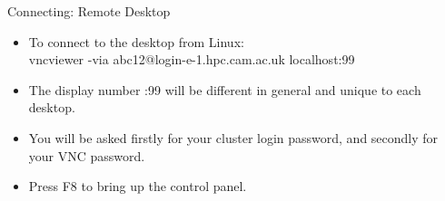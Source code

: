 \begin{frame}[fragile]{Connecting: Remote Desktop}
\begin{itemize}
\item To connect to the desktop from Linux:\\\hfill\break
{\scriptsize
\alert{vncviewer -via abc12@login-e-1.hpc.cam.ac.uk localhost:99}}
\smallskip
\item{The display number \alert{:99} will be different in general and unique to each desktop.}
\item{You will be asked firstly for your cluster login password, and secondly for your VNC password.}
\item{\alert{Press F8 to bring up the control panel.}}
\pause
\end{itemize}
\end{frame}









